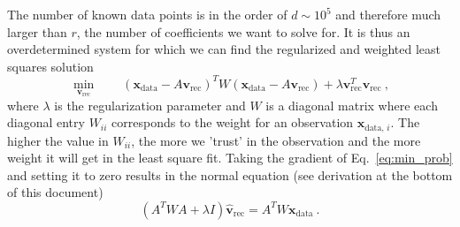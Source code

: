 \documentclass[a4paper]{article}
\begin{document}
The number of known data points is in the order of $d \sim 10^5$ and therefore much larger than $r$, the number of coefficients we want to solve for.
It is thus an overdetermined system for which we can find the regularized and weighted least squares solution
\begin{equation} \label{eq:min_prob}
    \min_{\mathbf{v_\mathrm{rec}}}  \qquad  (\mathbf{x}_\mathrm{data}- A \mathbf{v}_\mathrm{rec})^T W (\mathbf{x}_\mathrm{data}- A \mathbf{v}_\mathrm{rec}) + \lambda \mathbf{v}_\mathrm{rec}^T \mathbf{v}_\mathrm{rec}~,
\end{equation}
where $\lambda$ is the regularization parameter and $W$ is a diagonal matrix where each diagonal entry $W_{ii}$ corresponds to the weight for an observation $\mathbf{x}_{\mathrm{data},\,i}$.
The higher the value in $W_{ii}$, the more we 'trust' in the observation and the more weight it will get in the least square fit.
Taking the gradient of Eq.~\eqref{eq:min_prob} and setting it to zero results in the normal equation (see derivation at the bottom of this document)
\begin{equation} \label{eq:normal_eq}
    (A^T W A+\lambda I)\hat{\mathbf{v}}_\mathrm{rec} = A^T W \mathbf{x}_\mathrm{data}~.
\end{equation}


\end{document}
